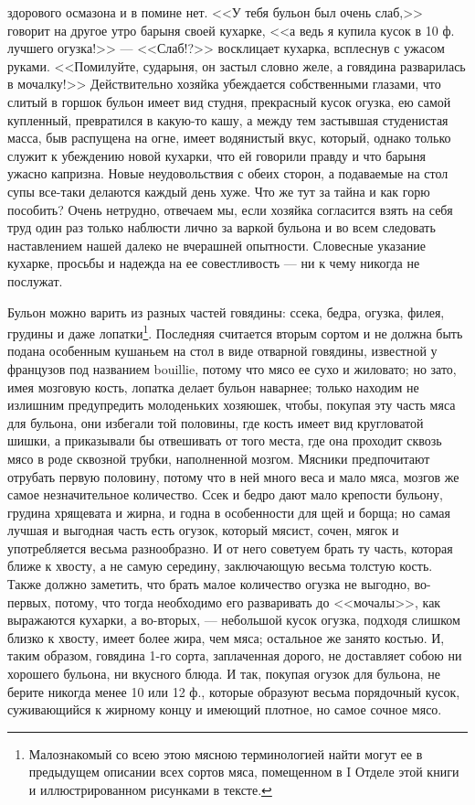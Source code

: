 здорового осмазона и в помине нет. <<У тебя бульон был очень слаб,>> говорит на другое утро барыня своей кухарке, <<а ведь я купила кусок в 10 ф. лучшего огузка!>> — <<Слаб!?>> восклицает кухарка, всплеснув с ужасом руками. <<Помилуйте, сударыня, он застыл словно желе, а говядина разварилась в мочалку!>> Действительно хозяйка убеждается собственными глазами, что слитый в горшок бульон имеет вид студня, прекрасный кусок огузка, ею самой купленный, превратился в какую-то кашу, а между тем застывшая студенистая масса, быв распущена на огне, имеет водянистый вкус, который, однако только служит к убеждению новой кухарки, что ей говорили правду и что барыня ужасно капризна. Новые неудовольствия с обеих сторон, а подаваемые на стол супы все-таки делаются каждый день хуже. Что же тут за тайна и как горю пособить? Очень нетрудно, отвечаем мы, если хозяйка согласится взять на себя труд один раз только наблюсти лично за варкой бульона и во всем следовать наставлением нашей далеко не вчерашней опытности. Словесные указание кухарке, просьбы и надежда на ее совестливость — ни к чему никогда не послужат.

Бульон можно варить из разных частей говядины: ссека, бедра, огузка, филея, грудины и даже лопатки\footnote{Малознакомый со всею этою мясною терминологией найти могут ее в предыдущем описании всех сортов мяса, помещенном в I Отделе этой книги и иллюстрированном рисунками в тексте.}. Последняя считается вторым сортом и не должна быть подана особенным кушаньем на стол в виде отварной говядины, известной у французов под названием bouillie, потому что мясо ее сухо и жиловато; но зато, имея мозговую кость, лопатка делает бульон наварнее; только находим не излишним предупредить молоденьких хозяюшек, чтобы, покупая эту часть мяса для бульона, они избегали той половины, где кость имеет вид кругловатой шишки, а приказывали бы отвешивать от того места, где она проходит сквозь мясо в роде сквозной трубки, наполненной мозгом. Мясники предпочитают отрубать первую половину, потому что в ней много веса и мало мяса, мозгов же самое незначительное количество. Ссек и бедро дают мало крепости бульону, грудина хрящевата и жирна, и годна в особенности для щей и борща; но самая лучшая и выгодная часть есть огузок, который мясист, сочен, мягок и употребляется весьма разнообразно. И от него советуем брать ту часть, которая ближе к хвосту, а не самую середину, заключающую весьма толстую кость. Также должно заметить, что брать малое количество огузка не выгодно, во-первых, потому, что тогда необходимо его разваривать до <<мочалы>>, как выражаются кухарки, а во-вторых, — небольшой кусок огузка, подходя слишком близко к хвосту, имеет более жира, чем мяса; остальное же занято костью. И, таким образом, говядина 1-го сорта, заплаченная дорого, не доставляет собою ни хорошего бульона, ни вкусного блюда. И так, покупая огузок для бульона, не берите никогда менее 10 или 12 ф., которые образуют весьма порядочный кусок, суживающийся к жирному концу и имеющий плотное, но самое сочное мясо.

